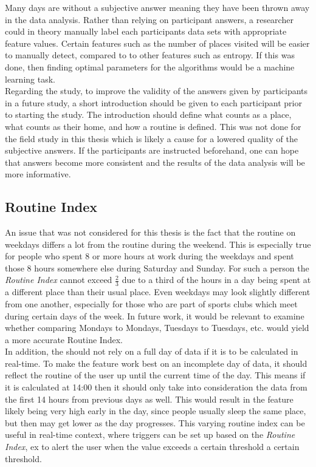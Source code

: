 Many days are without a subjective answer meaning they have been thrown away in the data analysis. Rather than relying on participant answers, a researcher could in theory manually label each participants data sets with appropriate feature values. Certain features such as the number of places visited will be easier to manually detect, compared to to other features such as entropy. If this was done, then finding optimal parameters for the algorithms would be a machine learning task. \\

Regarding the study, to improve the validity of the answers given by participants in a future study, a short introduction should be given to each participant prior to starting the study. The introduction should define what counts as a place, what counts as their home, and how a routine is defined. This was not done for the field study in this thesis which is likely a cause for a lowered quality of the subjective answers. If the participants are instructed beforehand, one can hope that answers become more consistent and the results of the data analysis will be more informative.

\subsection{Routine Index}
An issue that was not considered for this thesis is the fact that the routine on weekdays differs a lot from the routine during the weekend. This is especially true for people who spent 8 or more hours at work during the weekdays and spent those 8 hours somewhere else during Saturday and Sunday. For such a person the \textit{Routine Index} cannot exceed $\frac{2}{3}$ due to a third of the hours in a day being spent at a different place than their usual place. Even weekdays may look slightly different from one another, especially for those who are part of sports clubs which meet during certain days of the week. In future work, it would be relevant to examine whether comparing Mondays to Mondays, Tuesdays to Tuesdays, etc. would yield a more accurate Routine Index.\\

In addition, the  should not rely on a full day of data if it is to be calculated in real-time. To make the feature work best on an incomplete day of data, it should reflect the routine of the user up until the current time of the day. This means if it is calculated at 14:00 then it should only take into consideration the data from the first 14 hours from previous days as well. This would result in the feature likely being very high early in the day, since people usually sleep the same place, but then may get lower as the day progresses. This varying routine index can be useful in real-time context, where triggers can be set up based on the \textit{Routine Index}, ex to alert the user when the value exceeds a certain threshold a certain threshold.\\

